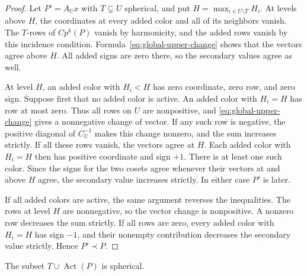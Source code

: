 \begin{proof}
Let $P'=A_Ux$ with $T\subsetneq U$ spherical, and put
$H=\max_{i\in U\setminus T}H_i$.  At levels above $H$, the coordinates
at every added color and all of its neighbors vanish.  The $T$-rows of
$Cp^k(P)$ vanish by harmonicity, and the added rows vanish by this
incidence condition.  Formula~\eqref{eq:global-upper-change} shows that
the vectors agree above $H$.  All added signs are zero there, so the
secondary values agree as well.

At level $H$, an added color with $H_i<H$ has zero coordinate, zero row,
and zero sign.  Suppose first that no added color is active.  An added
color with $H_i=H$ has row at most zero.  Thus all rows on $U$ are
nonpositive, and \eqref{eq:global-upper-change} gives a nonnegative
change of vector.  If any such row is negative, the positive diagonal of
$C_U^{-1}$ makes this change nonzero, and the sum increases strictly.
If all these rows vanish, the vectors agree at $H$.  Each added color
with $H_i=H$ then has positive coordinate and sign $+1$.  There is at
least one such color.  Since the signs for the two cosets agree whenever
their vectors at and above $H$ agree, the secondary value increases
strictly.  In either case $P'$ is later.

If all added colors are active, the same argument reverses the
inequalities.  The rows at level $H$ are nonnegative, so the vector change
is nonpositive.  A nonzero row decreases the sum strictly.  If all rows
are zero, every added color with $H_i=H$ has sign $-1$, and their
nonempty contribution decreases the secondary value strictly.  Hence
$P'\prec P$.
\end{proof}

\begin{lemma}\label{lem:global-active-spherical}
The subset $T\cup\operatorname{Act}(P)$ is spherical.
\end{lemma}

